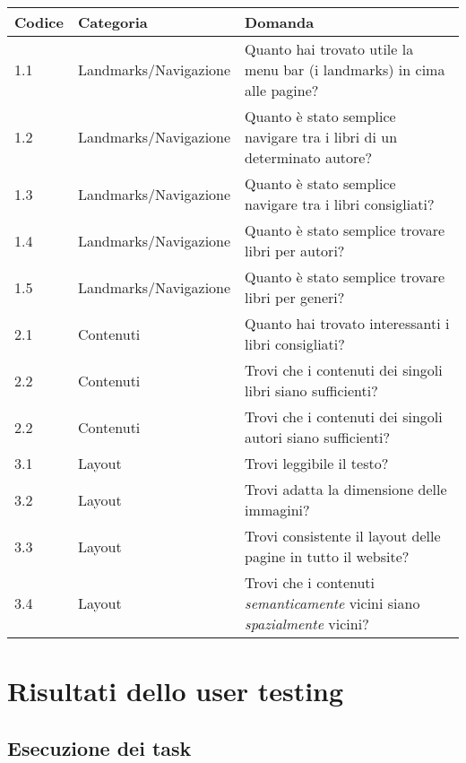 \documentclass[12pt,a4paper,oneside]{report}
\begin{document}
\begin{tabular}{|l|l|p{8cm}|}
	\hline
	\textbf{Codice} & \textbf{Categoria} & \textbf{Domanda} \\ \hline
	1.1 & Landmarks/Navigazione & Quanto hai trovato utile la menu bar (i landmarks) in cima alle pagine? \\
	1.2 & Landmarks/Navigazione & Quanto è stato semplice navigare tra i libri di un determinato autore? \\
	1.3 & Landmarks/Navigazione & Quanto è stato semplice navigare tra i libri consigliati? \\
	1.4 & Landmarks/Navigazione & Quanto è stato semplice trovare libri per autori? \\
	1.5 & Landmarks/Navigazione & Quanto è stato semplice trovare libri per generi? \\
	2.1 & Contenuti & Quanto hai trovato interessanti i libri consigliati? \\
	2.2 & Contenuti & Trovi che i contenuti dei singoli libri siano sufficienti? \\
	2.2 & Contenuti & Trovi che i contenuti dei singoli autori siano sufficienti? \\
	3.1 & Layout & Trovi leggibile il testo? \\
	3.2 & Layout & Trovi adatta la dimensione delle immagini? \\
	3.3 & Layout & Trovi consistente il layout delle pagine in tutto il website? \\
	3.4 & Layout & Trovi che i contenuti \textit{semanticamente} vicini siano \textit{spazialmente} vicini? \\
	\hline
\end{tabular}
\label{valutation_table}

\newpage

\chapter{Risultati dello user testing}

\section{Esecuzione dei task}
\end{document}
